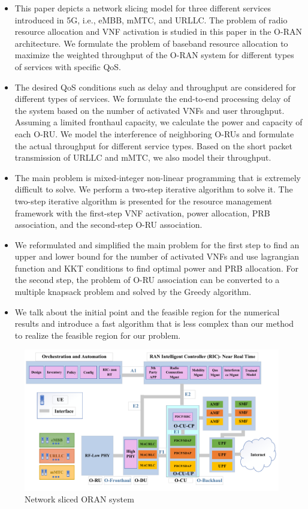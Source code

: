 \documentclass[lettersize,journal]{IEEEtran}
\begin{document}
\begin{itemize}
\item This paper depicts a network slicing model for three different services introduced in 5G, i.e., eMBB, mMTC, and URLLC. The problem of radio resource allocation and VNF activation is studied in this paper in the O-RAN architecture.
We formulate the problem of baseband resource allocation to maximize the weighted throughput of the O-RAN system for different types of services with specific QoS. 
\item The desired QoS conditions such as delay and throughput are considered for different types of services. We formulate the end-to-end processing delay of the system based on the number of activated VNFs and user throughput.
Assuming a limited fronthaul capacity, we calculate the power and capacity of each O-RU. We model the interference of neighboring O-RUs and formulate the actual throughput for different service types. Based on the short packet transmission of URLLC and mMTC, we also model their throughput.
\item The main problem is mixed-integer non-linear programming that is extremely difficult to solve.
We perform a two-step iterative algorithm to solve it.
The two-step iterative algorithm is presented for the resource management framework with the first-step VNF activation, power allocation, PRB association, and the second-step O-RU association.
\item We reformulated and simplified the main problem for the first step to find an upper and lower bound for the number of activated VNFs and use lagrangian function and KKT conditions to find optimal power and PRB allocation.
For the second step, the problem of O-RU association can be converted to a multiple knapsack problem and solved by the Greedy algorithm.
\item We talk about the initial point and the feasible region for the numerical results and introduce a fast algorithm that is less complex than our method to realize the feasible region for our problem.
\end{itemize}  
\begin{figure}
  \centering 
  \captionsetup{justification=centering}
    \includegraphics[scale = 0.45]{finalDraw.pdf}
  \caption{Network sliced ORAN system}
  \label{fig:c11}
\end{figure}
\end{document}

